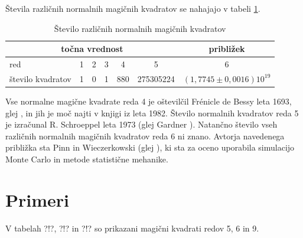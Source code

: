 \documentclass[a4paper,12pt]{article}
\begin{document}
Števila različnih normalnih magičnih kvadratov se nahajajo v tabeli \ref{table:stevila}.



\begin{table}[ht]
 \centering
 \caption{Število različnih normalnih magičnih kvadratov}
 \large 
 \normalsize
 \begin{tabular}{lcccccc}\toprule
   
 \multicolumn{6}{c}{točna vrednost} & približek \\ \midrule
 red & 1 & 2 & 3 & 4 & 5 & 6 \\
 število kvadratov & 1 & 0 & 1 & 880 & 275305224 & \((1{,}7745 \pm 0{,}0016)10^{19}\) \\
 \bottomrule
 \end{tabular}

 \label{table:stevila}   
\end{table}
Vse normalne magične kvadrate reda 4 je oštevilčil Frénicle de Bessy
leta 1693, glej \cite{bessy}, in jih je moč najti v knjigi \cite{berlekamp}
iz leta 1982. Število normalnih kvadratov reda 5 je izračunal
R. Schroeppel leta 1973 (glej Gardner \cite{gardner}).
Natančno število vseh različnih normalnih magičnih kvadratov reda 6 ni znano.
Avtorja navedenega približka sta Pinn in Wieczerkowski (glej \cite{pinn}), ki
sta za oceno uporabila simulacijo Monte Carlo in metode statistične mehanike.


\section{Primeri}

V tabelah ?!?, ?!? in ?!? so prikazani
magični kvadrati redov 5, 6 in 9.

\end{document}
